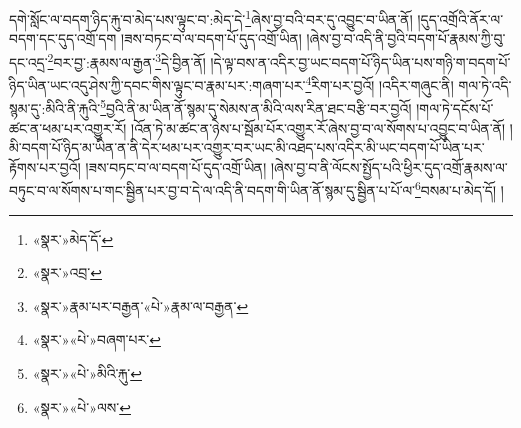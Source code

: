 དགེ་སློང་ལ་བདག་ཉིད་རྐུ་བ་མེད་པས་ལྟུང་བ་:མེད་དེ་\footnote{«སྣར་»མེད་དོ་}ཞེས་བྱ་བའི་བར་དུ་འབྱུང་བ་ཡིན་ནོ། །དུད་འགྲོའི་ནོར་ལ་བདག་དང་དུད་འགྲོ་དག །ཟས་བཏང་བ་ལ་བདག་པོ་དུད་འགྲོ་ཡིན། །ཞེས་བྱ་བ་འདི་ནི་བྱའི་བདག་པོ་རྣམས་ཀྱི་བུ་དང་འདྲ་\footnote{«སྣར་»འབྲ་}བར་བྱ་:རྣམས་ལ་རྒྱན་\footnote{«སྣར་»རྣམ་པར་བརྒྱན་«པེ་»རྣམ་ལ་བརྒྱན་}དེ་བྱིན་ནོ། །དེ་ལྟ་བས་ན་འདིར་བྱ་ཡང་བདག་པོ་ཉིད་ཡིན་པས་གཉི་ག་བདག་པོ་ཉིད་ཡིན་ཡང་འདུ་ཤེས་ཀྱི་དབང་གིས་ལྟུང་བ་རྣམ་པར་:གཞག་པར་\footnote{«སྣར་»«པེ་»བཞག་པར་}རིག་པར་བྱའོ། །འདིར་གཞུང་ནི། གལ་ཏེ་འདི་སྙམ་དུ་:མིའི་ནི་རྐུའི་\footnote{«སྣར་»«པེ་»མིའི་རྐུ་}བྱའི་ནི་མ་ཡིན་ནོ་སྙམ་དུ་སེམས་ན་མིའི་ལས་རིན་ཐང་བརྩི་བར་བྱའོ། །གལ་ཏེ་དངོས་པོ་ཚང་ན་ཕམ་པར་འགྱུར་རོ། །འོན་ཏེ་མ་ཚང་ན་ཉེས་པ་སྦོམ་པོར་འགྱུར་རོ་ཞེས་བྱ་བ་ལ་སོགས་པ་འབྱུང་བ་ཡིན་ནོ། །མི་བདག་པོ་ཉིད་མ་ཡིན་ན་ནི་དེར་ཕམ་པར་འགྱུར་བར་ཡང་མི་འཐད་པས་འདིར་མི་ཡང་བདག་པོ་ཡིན་པར་རྟོགས་པར་བྱའོ། །ཟས་བཏང་བ་ལ་བདག་པོ་དུད་འགྲོ་ཡིན། །ཞེས་བྱ་བ་ནི་ལོངས་སྤྱོད་པའི་ཕྱིར་དུད་འགྲོ་རྣམས་ལ་བཏུང་བ་ལ་སོགས་པ་གང་སྦྱིན་པར་བྱ་བ་དེ་ལ་འདི་ནི་བདག་གི་ཡིན་ནོ་སྙམ་དུ་སྦྱིན་པ་པོ་ལ་\footnote{«སྣར་»«པེ་»ལས་}བསམ་པ་མེད་དོ། །
